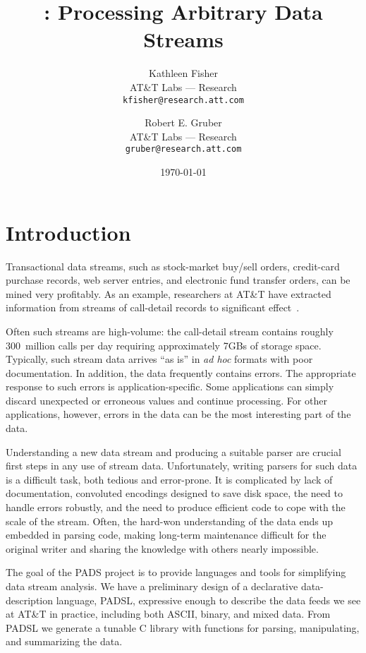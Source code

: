 \documentclass[10pt]{article}
\title{\vskip -1in \pads{}: Processing Arbitrary Data Streams}
\date{\today}
\author{
  Kathleen Fisher\\
  AT\&T Labs --- Research \\
  \small\texttt{kfisher@research.att.com}
\and
  Robert E. Gruber \\
  AT\&T Labs --- Research \\
  \small\texttt{gruber@research.att.com}
}
\begin{document}
\maketitle
\thispagestyle{empty}

\section{Introduction}
Transactional data streams, such as stock-market buy/sell orders,
credit-card purchase records, web server entries, and electronic fund
transfer orders, can be mined very profitably.  As an example,
researchers at AT\&T have extracted information from streams of
call-detail records to significant effect~\cite{kdd98,kdd99,kdd00}.   

Often such streams are high-volume: the call-detail stream contains
roughly 300~million calls per day requiring approximately 7GBs of
storage space.  Typically, such stream data arrives ``as is'' in
\textit{ad hoc} formats with poor documentation.  In addition, the
data frequently contains errors.  The appropriate response to such
errors is application-specific. Some applications can simply discard
unexpected or erroneous values and continue processing.  For other
applications, however, errors in the data can be the most interesting
part of the data.  

Understanding a new data stream and producing a suitable parser are
crucial first steps in any use of stream data.  Unfortunately, writing
parsers for such data is a difficult task, both tedious and
error-prone. It is complicated by lack of documentation, convoluted
encodings designed to save disk space, the need to handle errors
robustly, and the need to produce efficient code to cope with the
scale of the stream.  Often, the hard-won understanding of the data
ends up embedded in parsing code, making long-term maintenance
difficult for the original writer and sharing the knowledge with
others nearly impossible.

The goal of the PADS project is to provide languages and tools for
simplifying data stream analysis.  We have a preliminary design of a
declarative data-description language, PADSL, expressive enough to
describe the data feeds we see at AT\&T in practice, including both ASCII,
binary, and mixed data.  From PADSL we generate a tunable C library with
functions for parsing, manipulating, and summarizing the data.  
\end{document}
